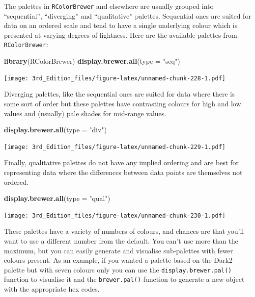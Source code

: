 \documentclass[
]{book}
\newenvironment{Shaded}{\begin{snugshade}}{\end{snugshade}}
\newcommand{\DataTypeTok}[1]{\textcolor[rgb]{0.13,0.29,0.53}{#1}}
\newcommand{\KeywordTok}[1]{\textcolor[rgb]{0.13,0.29,0.53}{\textbf{#1}}}
\newcommand{\NormalTok}[1]{#1}
\newcommand{\StringTok}[1]{\textcolor[rgb]{0.31,0.60,0.02}{#1}}
\begin{document}
The palettes in \texttt{RColorBrewer} and elsewhere are usually grouped into ``sequential'', ``diverging'' and ``qualitative'' palettes. Sequential ones are suited for data on an ordered scale and tend to have a single underlying colour which is presented at varying degrees of lightness. Here are the available palettes from \texttt{RColorBrewer}:

\begin{Shaded}
\begin{Highlighting}[]
\KeywordTok{library}\NormalTok{(RColorBrewer)}
\KeywordTok{display.brewer.all}\NormalTok{(}\DataTypeTok{type =} \StringTok{"seq"}\NormalTok{)}
\end{Highlighting}
\end{Shaded}

\texttt{[image: 3rd\_Edition\_files/figure-latex/unnamed-chunk-228-1.pdf]}

Diverging palettes, like the sequential ones are suited for data where there is some sort of order but these palettes have contrasting colours for high and low values and (usually) pale shades for mid-range values.

\begin{Shaded}
\begin{Highlighting}[]
\KeywordTok{display.brewer.all}\NormalTok{(}\DataTypeTok{type =} \StringTok{"div"}\NormalTok{)}
\end{Highlighting}
\end{Shaded}

\texttt{[image: 3rd\_Edition\_files/figure-latex/unnamed-chunk-229-1.pdf]}

Finally, qualitative palettes do not have any implied ordering and are best for representing data where the differences between data points are themselves not ordered.

\begin{Shaded}
\begin{Highlighting}[]
\KeywordTok{display.brewer.all}\NormalTok{(}\DataTypeTok{type =} \StringTok{"qual"}\NormalTok{)}
\end{Highlighting}
\end{Shaded}

\texttt{[image: 3rd\_Edition\_files/figure-latex/unnamed-chunk-230-1.pdf]}

These palettes have a variety of numbers of colours, and chances are that you'll want to use a different number from the default. You can't use more than the maximum, but you can easily generate and visualise sub-palettes with fewer colours present. As an example, if you wanted a palette based on the Dark2 palette but with seven colours only you can use the \texttt{display.brewer.pal()} function to visualise it and the \texttt{brewer.pal()} function to generate a new object with the appropriate hex codes.
\end{document}
